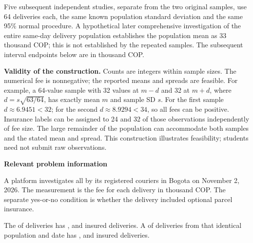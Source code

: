 Five subsequent independent studies, separate from the two original samples, use 64 deliveries each, the same known population standard deviation and the same 95\% normal procedure. A hypothetical later comprehensive investigation of the entire same-day delivery population establishes the population mean as 33 thousand COP; this is not established by the repeated samples. The subsequent interval endpoints below are in thousand COP.



\textbf{Validity of the construction.} Counts are integers within sample sizes. The numerical fee is nonnegative; the reported means and spreads are feasible. For example, a 64-value sample with 32 values at $m-d$ and 32 at $m+d$, where $d=s\sqrt{63/64}$, has exactly mean $m$ and sample SD $s$. For the first sample $d\approx6.9451<32$; for the second $d\approx8.9294<34$, so all fees can be positive. Insurance labels can be assigned to 24 and 32 of those observations independently of fee size. The large remainder of the population can accommodate both samples and the stated mean and spread. This construction illustrates feasibility; students need not submit raw observations.

\secInicio[][sec:p3]

\clearpage



\textbf{Relevant problem information}

\begin{probleminfoexcerpt}
A platform investigates all    by its registered couriers in Bogota on November 2, 2026. The measurement is the fee for each delivery in thousand COP. The separate yes-or-no condition is whether the delivery included optional parcel insurance.
\end{probleminfoexcerpt}

\begin{probleminfoexcerpt}
The     of  deliveries has     ,       and  insured deliveries. A     of  deliveries from that identical population and date has     ,       and  insured deliveries.
\end{probleminfoexcerpt}

